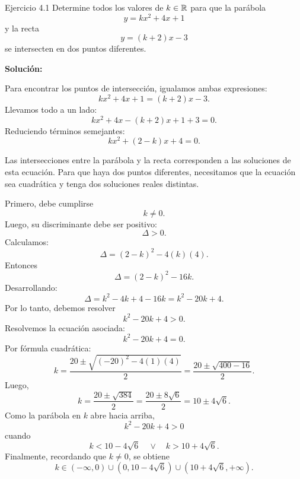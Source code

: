 \documentclass[letterpaper, 12pt]{article}
\begin{document}

\begin{solucionbox}{Ejercicio 4.1}
Determine todos los valores de $k\in\mathbb{R}$ para que la par\'abola
\[
    y=kx^2+4x+1
\]
y la recta
\[
    y=(k+2)x-3
\]
se intersecten en dos puntos diferentes.

\textbf{Soluci\'on:}

Para encontrar los puntos de intersecci\'on, igualamos ambas expresiones:
\[
    kx^2+4x+1=(k+2)x-3.
\]
Llevamos todo a un lado:
\[
    kx^2+4x-(k+2)x+1+3=0.
\]
Reduciendo t\'erminos semejantes:
\[
    kx^2+(2-k)x+4=0.
\]

Las intersecciones entre la par\'abola y la recta corresponden a las soluciones de esta ecuaci\'on. Para que haya dos puntos diferentes, necesitamos que la ecuaci\'on sea cuadr\'atica y tenga dos soluciones reales distintas.

Primero, debe cumplirse
\[
    k\neq 0.
\]
Luego, su discriminante debe ser positivo:
\[
    \Delta>0.
\]
Calculamos:
\[
    \Delta=(2-k)^2-4(k)(4).
\]
Entonces
\[
    \Delta=(2-k)^2-16k.
\]
Desarrollando:
\[
    \Delta=k^2-4k+4-16k
    =k^2-20k+4.
\]
Por lo tanto, debemos resolver
\[
    k^2-20k+4>0.
\]
Resolvemos la ecuaci\'on asociada:
\[
    k^2-20k+4=0.
\]
Por f\'ormula cuadr\'atica:
\[
    k=\frac{20\pm\sqrt{(-20)^2-4(1)(4)}}{2}
     =\frac{20\pm\sqrt{400-16}}{2}.
\]
Luego,
\[
    k=\frac{20\pm\sqrt{384}}{2}
     =\frac{20\pm 8\sqrt6}{2}
     =10\pm4\sqrt6.
\]
Como la par\'abola en $k$ abre hacia arriba,
\[
    k^2-20k+4>0
\]
cuando
\[
    k<10-4\sqrt6
    \quad\vee\quad
    k>10+4\sqrt6.
\]
Finalmente, recordando que $k\neq0$, se obtiene
\[
    k\in(-\infty,0)\cup(0,10-4\sqrt6)\cup(10+4\sqrt6,+\infty).
\]

\end{solucionbox}
\end{document}
